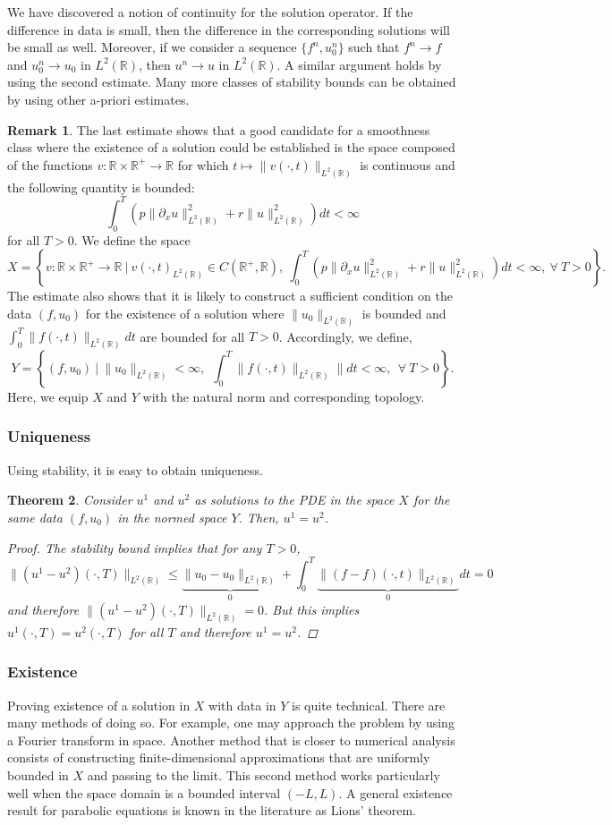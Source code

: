 \documentclass{article}
\newtheorem{theorem}{Theorem}[subsection] %
\theoremstyle{definition}
\theoremstyle{definition}
\newtheorem{remark}[theorem]{Remark}
\newcommand{\R}{\mathbb{R}}
\begin{document}
We have discovered a notion of continuity for the solution operator. If the difference in data is small, then the difference in the corresponding solutions will be small as well. Moreover, if we consider a sequence $\{f^n,u^n_0\}$ such that $f^n\to f$ and $u^n_0\to u_0$ in $L^2(\R)$, then $u^n\to u$ in $L^2(\R)$. A similar argument holds by using the second estimate. Many more classes of stability bounds can be obtained by using other a-priori estimates.
\begin{remark}
    The last estimate shows that a good candidate for a smoothness class where the existence of a solution could be established is the space composed of the functions $v:\R\times \R^+\to \R$ for which $t\mapsto \|v(\cdot,t)\|_{L^2(\R)}$ is continuous and the following quantity is bounded:
    $$\int_{0}^{T}(p\|\partial_{x}u\|^2_{L^2(\R)}+r\|u\|^2_{L^2(\R)})dt<\infty$$
    for all $T>0$. We define the space
    $$X=\left\{v:\R\times \R^+\to \R\:|\:v(\cdot,t)_{L^2(\R)}\in C(\R^+,\R),\:\int_{0}^{T}(p\|\partial_{x}u\|^2_{L^2(\R)}+r\|u\|^2_{L^2(\R)})dt<\infty,\:\forall\:T>0\right\}.$$
    The estimate also shows that it is likely to construct a sufficient condition on the data $(f,u_0)$ for the existence of a solution where $\|u_0\|_{L^2(\R)}$ is bounded and $\int_{0}^{T}\|f(\cdot,t)\|_{L^2(\R)}dt$ are bounded for all $T>0$. Accordingly, we define,
    $$Y=\left\{(f,u_0)\:|\:\|u_0\|_{L^2(\R)}<\infty,\:\:\int_{0}^{T}\|f(\cdot,t)\|_{L^2(\R)}\|dt<\infty,\:\:\forall\:T>0\right\}.$$
   Here, we equip $X$ and $Y$ with the natural norm and corresponding topology.
\end{remark}
\subsubsection{Uniqueness}
Using stability, it is easy to obtain uniqueness.
\begin{theorem}
    Consider $u^1$ and $u^2$ as solutions to the PDE in the space $X$ for the same data $(f,u_0)$ in the normed space $Y$. Then, $u^1=u^2$.
    \begin{proof}
        The stability bound implies that for any $T>0$,
        $$\|(u^1-u^2)(\cdot,T)\|_{L^2(\R)}\leq \underbrace{\|u_0-u_0\|_{L^2(\R)}}_{0}+\int_{0}^{T}\underbrace{\|(f-f)(\cdot,t)\|_{L^2(\R)}}_{0}dt=0$$
        and therefore $\|(u^1-u^2)(\cdot,T)\|_{L^2(\R)}=0$. But this implies $u^1(\cdot, T)=u^2(\cdot,T)$ for all $T$ and therefore $u^1=u^2$.
    \end{proof}
\end{theorem}
\subsubsection{Existence}
Proving existence of a solution in $X$ with data in $Y$ is quite technical. There are many methods of doing so. For example, one may approach the problem by using a Fourier transform in space. Another method that is closer to numerical analysis consists of constructing
finite-dimensional approximations that are uniformly bounded in $X$ and passing to the limit. This second method works particularly well when the space domain is
a bounded interval $(-L, L)$. A general existence result for parabolic equations is known in the literature as Lions' theorem.
\end{document}
